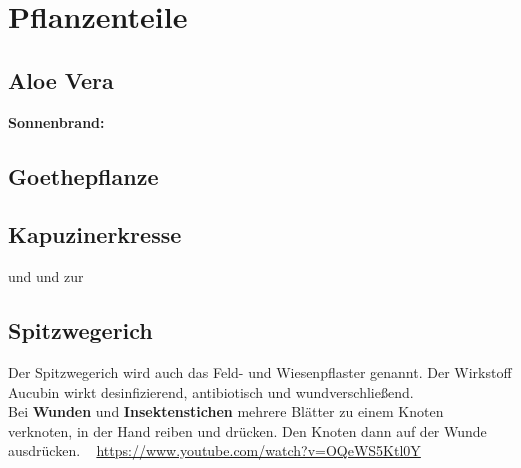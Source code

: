 \section{Pflanzenteile}


\subsection{Aloe Vera}

\textbf{Sonnenbrand:}


\subsection{Goethepflanze}


\subsection{Kapuzinerkresse}

 und  und zur 


\subsection{Spitzwegerich}

Der Spitzwegerich wird auch das Feld- und Wiesenpflaster genannt. Der Wirkstoff Aucubin wirkt desinfizierend, antibiotisch und wundverschließend.\\
Bei \textbf{Wunden} und \textbf{Insektenstichen} mehrere Blätter zu einem Knoten verknoten, in der Hand reiben und drücken. Den Knoten dann auf der Wunde ausdrücken. ~\cite{swrhandwerkskunst}  \url{https://www.youtube.com/watch?v=OQeWS5Ktl0Y}

